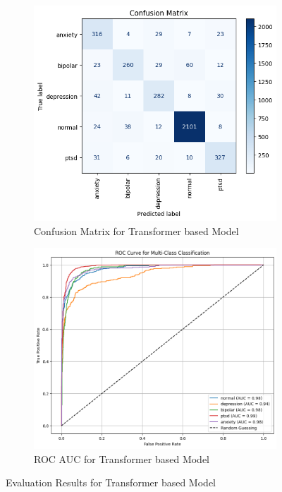 \begin{figure}[h!]
    \centering
    \begin{subfigure}[b]{0.49\textwidth}
        \centering
        \includegraphics[width=\textwidth]{Images/T CM.png}
        \caption{Confusion Matrix for Transformer based Model}
        \label{dfdl145}  %
    \end{subfigure}
    \hfill
    \begin{subfigure}[b]{0.49\textwidth}
        \centering
        \includegraphics[width=\textwidth]{Images/T ROC.png}
        \caption{ROC AUC for Transformer based Model}
        \label{dfdl146}  %
    \end{subfigure}
    \caption{Evaluation Results for Transformer based Model}
    \label{fig:transformer_comparison}
\end{figure}


